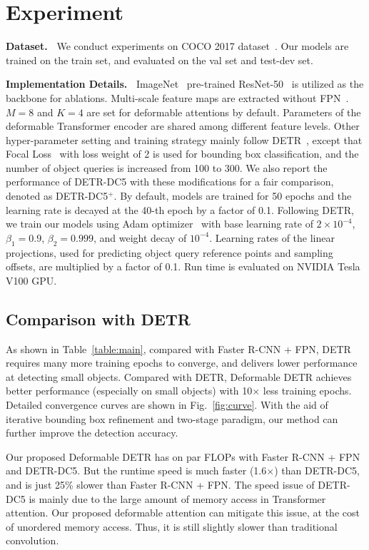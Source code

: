 \section{Experiment}

\textbf{Dataset.~} We conduct experiments on COCO 2017 dataset~\citep{lin2014microsoft}. Our models are trained on the train set, and evaluated on the val set and test-dev set.

\textbf{Implementation Details.~} 
ImageNet~\citep{deng2009imagenet} pre-trained ResNet-50~\citep{he2016deep} is utilized as the backbone for ablations. Multi-scale feature maps are extracted without FPN~\citep{lin2017feature}.
$M = 8$ and $K = 4$ are set for deformable attentions by default.
Parameters of the deformable Transformer encoder are shared among different feature levels.
Other hyper-parameter setting and training strategy mainly follow DETR~\citep{carion2020end}, except that Focal Loss~\citep{lin2017focal} with loss weight of 2 is used for bounding box classification, and the number of object queries is increased from 100 to 300.  
We also report the performance of DETR-DC5 with these modifications for a fair comparison, denoted as DETR-DC5$^+$. By default, models are trained for 50 epochs and the learning rate is decayed at the 40-th epoch by a factor of 0.1. Following DETR\citep{carion2020end}, we train our models using Adam optimizer~\citep{kingma2014adam} with base learning rate of $2 \times 10^{-4}$, $\beta_1=0.9$, $\beta_2=0.999$, and weight decay of $10^{-4}$. 
Learning rates of the linear projections, used for predicting object query reference points and sampling offsets, are multiplied by a factor of 0.1.
Run time is evaluated on NVIDIA Tesla V100 GPU.

\subsection{Comparison with DETR}

As shown in Table~\ref{table:main}, compared with Faster R-CNN + FPN, DETR requires many more training epochs to converge, and delivers lower performance at detecting small objects. Compared with DETR, Deformable DETR achieves better performance (especially on small objects) with 10$\times$ less training epochs. Detailed convergence curves are shown in Fig.~\ref{fig:curve}. With the aid of iterative bounding box refinement and two-stage paradigm, our method can further improve the detection accuracy.

Our proposed Deformable DETR has on par FLOPs with Faster R-CNN + FPN and DETR-DC5. But the runtime speed is much faster (1.6$\times$) than DETR-DC5, and is just 25\% slower than Faster R-CNN + FPN. The speed issue of DETR-DC5 is mainly due to the large amount of memory access in Transformer attention. Our proposed deformable attention can mitigate this issue, at the cost of unordered memory access. Thus, it is still slightly slower than traditional convolution. 

